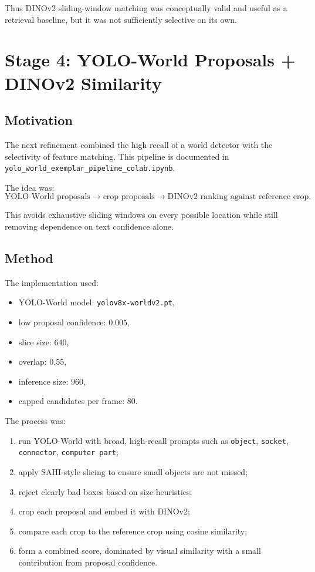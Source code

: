 \documentclass[11pt,a4paper]{article}
\begin{document}
Thus DINOv2 sliding-window matching was conceptually valid and useful as a retrieval baseline, but it was not sufficiently selective on its own.

\section{Stage 4: YOLO-World Proposals + DINOv2 Similarity}

\subsection{Motivation}

The next refinement combined the high recall of a world detector with the selectivity of feature matching. This pipeline is documented in \texttt{yolo\_world\_exemplar\_pipeline\_colab.ipynb}.

The idea was:
\[
\text{YOLO-World proposals} \rightarrow \text{crop proposals} \rightarrow \text{DINOv2 ranking against reference crop}.
\]

This avoids exhaustive sliding windows on every possible location while still removing dependence on text confidence alone.

\subsection{Method}

The implementation used:
\begin{itemize}[leftmargin=1.5em]
  \item YOLO-World model: \texttt{yolov8x-worldv2.pt},
  \item low proposal confidence: \(0.005\),
  \item slice size: \(640\),
  \item overlap: \(0.55\),
  \item inference size: \(960\),
  \item capped candidates per frame: \(80\).
\end{itemize}

The process was:
\begin{enumerate}[leftmargin=1.5em]
  \item run YOLO-World with broad, high-recall prompts such as \texttt{object}, \texttt{socket}, \texttt{connector}, \texttt{computer part};
  \item apply SAHI-style slicing to ensure small objects are not missed;
  \item reject clearly bad boxes based on size heuristics;
  \item crop each proposal and embed it with DINOv2;
  \item compare each crop to the reference crop using cosine similarity;
  \item form a combined score, dominated by visual similarity with a small contribution from proposal confidence.
\end{enumerate}
\end{document}

